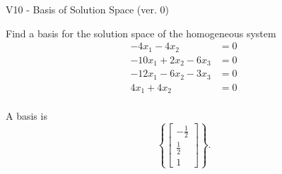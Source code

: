\begin{exercise}
  \begin{exerciseTitle}V10 - Basis of Solution Space (ver. 0)\end{exerciseTitle}
  \begin{exerciseStatement}
    Find a basis for the solution space of the homogeneous system 
\begin{align*}
 -4 x_ 1 -4 x_ 2 &= 0  \\ 
  -10 x_ 1 + 2 x_ 2 -6 x_ 3 &= 0  \\ 
  -12 x_ 1 -6 x_ 2 -3 x_ 3 &= 0  \\ 
  4 x_ 1 + 4 x_ 2 &= 0  \\ 
 \end{align*}


 
  \end{exerciseStatement}

  \begin{exerciseAnswer}
   A basis is   
\[\left\{\left[\begin{array}{c}
-\frac{1}{2} \\
\frac{1}{2} \\
1
\end{array}\right]\right\}.\]

  


  \end{exerciseAnswer}
\end{exercise}